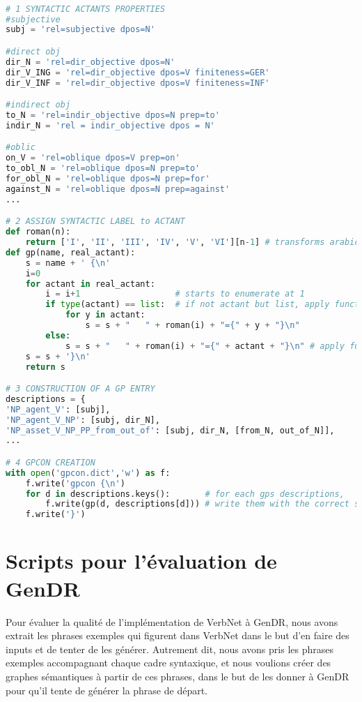 \begin{lstlisting}[language=Python, caption = Création du dictionnaire de patrons de régime]

# 1 SYNTACTIC ACTANTS PROPERTIES
#subjective
subj = 'rel=subjective dpos=N'

#direct obj
dir_N = 'rel=dir_objective dpos=N'
dir_V_ING = 'rel=dir_objective dpos=V finiteness=GER'
dir_V_INF = 'rel=dir_objective dpos=V finiteness=INF'

#indirect obj
to_N = 'rel=indir_objective dpos=N prep=to'
indir_N = 'rel = indir_objective dpos = N'

#oblic
on_V = 'rel=oblique dpos=V prep=on'
to_obl_N = 'rel=oblique dpos=N prep=to' 
for_obl_N = 'rel=oblique dpos=N prep=for'
against_N = 'rel=oblique dpos=N prep=against'
...

# 2 ASSIGN SYNTACTIC LABEL to ACTANT
def roman(n):
    return ['I', 'II', 'III', 'IV', 'V', 'VI'][n-1] # transforms arabic numbers in roman numbers
def gp(name, real_actant):
    s = name + ' {\n'
    i=0
    for actant in real_actant:
        i = i+1                   # starts to enumerate at 1
        if type(actant) == list:  # if not actant but list, apply function to actants in list
            for y in actant:
                s = s + "   " + roman(i) + "={" + y + "}\n"
        else:
            s = s + "   " + roman(i) + "={" + actant + "}\n" # apply function to actant
    s = s + '}\n'
    return s 

# 3 CONSTRUCTION OF A GP ENTRY
descriptions = {
'NP_agent_V': [subj],
'NP_agent_V_NP': [subj, dir_N],
'NP_asset_V_NP_PP_from_out_of': [subj, dir_N, [from_N, out_of_N]],
...

# 4 GPCON CREATION
with open('gpcon.dict','w') as f: 
    f.write('gpcon {\n')
    for d in descriptions.keys():       # for each gps descriptions,
        f.write(gp(d, descriptions[d])) # write them with the correct syntactic label
    f.write('}')
\end{lstlisting}

\section{Scripts pour l'évaluation de GenDR}

Pour évaluer la qualité de l'implémentation de VerbNet à GenDR, nous avons extrait les phrases exemples qui figurent dans VerbNet dans le but d'en faire des inputs et de tenter de les générer. Autrement dit, nous avons pris les phrases exemples accompagnant chaque cadre syntaxique, et nous voulions créer des graphes sémantiques à partir de ces phrases, dans le but de les donner à GenDR pour qu'il tente de générer la phrase de départ.

